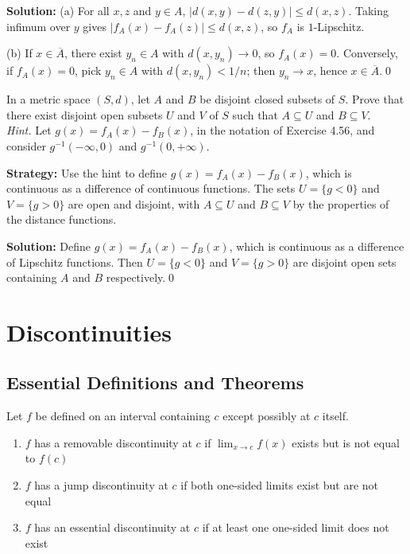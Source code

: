 \bigskip\noindent\textbf{Solution:}
(a) For all $x,z$ and $y\in A$, $|d(x,y)-d(z,y)|\le d(x,z)$. Taking infimum over $y$ gives $|f_A(x)-f_A(z)|\le d(x,z)$, so $f_A$ is $1$-Lipschitz.

(b) If $x\in\overline{A}$, there exist $y_n\in A$ with $d(x,y_n)\to 0$, so $f_A(x)=0$. Conversely, if $f_A(x)=0$, pick $y_n\in A$ with $d(x,y_n)<1/n$; then $y_n\to x$, hence $x\in\overline{A}$.\qed



\begin{problembox}
\begin{problemstatement}
In a metric space $(S, d)$, let $A$ and $B$ be disjoint closed subsets of $S$. Prove that there exist disjoint open subsets $U$ and $V$ of $S$ such that $A \subseteq U$ and $B \subseteq V$. \\
\textit{Hint.} Let $g(x) = f_A(x) - f_B(x)$, in the notation of Exercise 4.56, and consider $g^{-1}(-\infty, 0)$ and $g^{-1}(0, +\infty)$.
\end{problemstatement}
\end{problembox}

\noindent\textbf{Strategy:} Use the hint to define $g(x) = f_A(x) - f_B(x)$, which is continuous as a difference of continuous functions. The sets $U = \{g < 0\}$ and $V = \{g > 0\}$ are open and disjoint, with $A \subseteq U$ and $B \subseteq V$ by the properties of the distance functions.

\bigskip\noindent\textbf{Solution:}
Define $g(x)=f_A(x)-f_B(x)$, which is continuous as a difference of Lipschitz functions. Then $U=\{g<0\}$ and $V=\{g>0\}$ are disjoint open sets containing $A$ and $B$ respectively.\qed

\section{Discontinuities}

\subsection*{Essential Definitions and Theorems}

\begin{definition}
Let $f$ be defined on an interval containing $c$ except possibly at $c$ itself.
\begin{enumerate}
\item $f$ has a removable discontinuity at $c$ if $\lim_{x \to c} f(x)$ exists but is not equal to $f(c)$
\item $f$ has a jump discontinuity at $c$ if both one-sided limits exist but are not equal
\item $f$ has an essential discontinuity at $c$ if at least one one-sided limit does not exist
\end{enumerate}
\end{definition}



